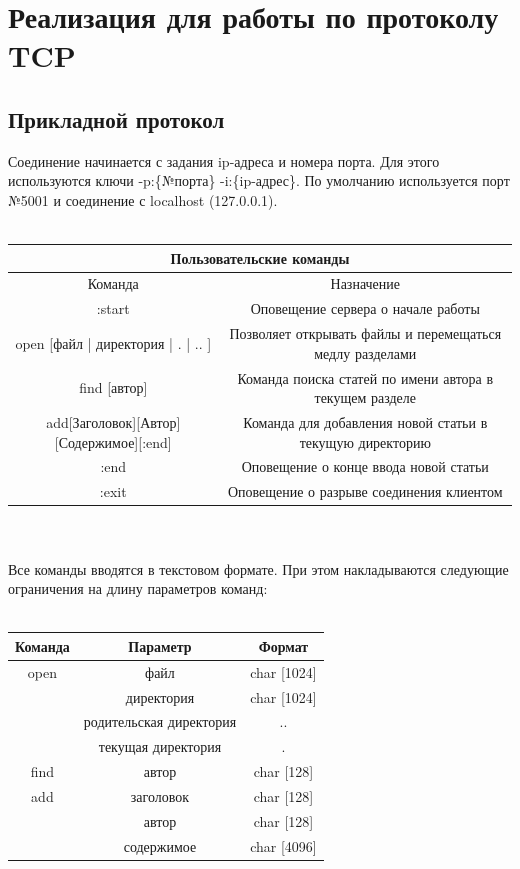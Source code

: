 \documentclass[12pt,a4paper]{report}
\begin{document}
\chapter{Реализация для работы по протоколу TCP}
\section{Прикладной протокол}
\label{protocol_tcp}
Соединение начинается с задания ip-адреса и номера порта. Для этого используются ключи -p:\{№порта\} -i:\{ip-адрес\}.
По умолчанию используется порт №5001 и соединение с localhost (127.0.0.1).\\ \\
\hspace*{-5em} 
\begin{tabular}{c|c}
\hline
\multicolumn{2}{c}{\textbf{Пользовательские команды}}\\
\hline 
\small Команда &\small Назначение \\ 
\hline 
\small :start &\small Оповещение сервера о начале работы \\ 

\small open [файл | директория | . | .. ] & \small Позволяет открывать файлы и перемещаться медлу разделами \\ 

\small find [автор] & \small Команда поиска статей по имени автора в текущем разделе\\ 

\small add[Заголовок][Автор][Содержимое][:end] &\small Команда для добавления новой статьи в текущую директорию \\ 
 
\small :end & \small Оповещение о конце ввода новой статьи \\ 

\small :exit &\small Оповещение о разрыве соединения клиентом \\ 
\hline
\end{tabular} 
\\ 
\\Все команды вводятся в текстовом формате. При этом накладываются следующие ограничения на длину параметров команд:\\
\\
\begin{tabular}{|c|c|c|}
\hline 
Команда & Параметр & Формат \\ 
\hline 
open & файл & char [1024] \\ 
 
  & директория & char [1024] \\ 

  & родительская директория & .. \\ 

  & текущая директория & . \\ 
\hline 
find & автор & char [128] \\ 
\hline 
add & заголовок & char [128] \\ 

  & автор & char [128] \\ 
 
  & содержимое & char [4096] \\ 
\hline 
\end{tabular} 
\end{document}
